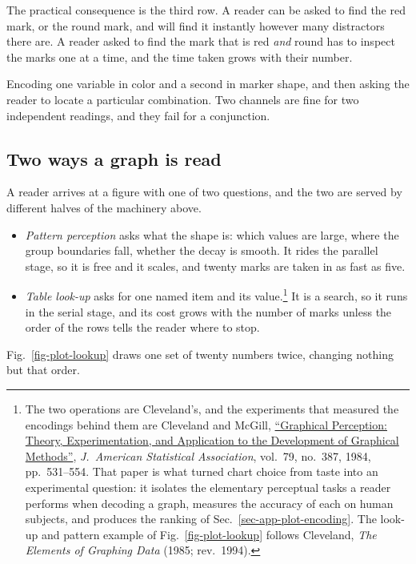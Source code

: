 The practical consequence is the third row. A reader can be asked to find the red mark, or the round mark, and will find it instantly however many distractors there are. A reader asked to find the mark that is red \textit{and} round has to inspect the marks one at a time, and the time taken grows with their number. \begin{box_blue}
Encoding one variable in color and a second in marker shape, and then asking the reader to locate a particular combination. Two channels are fine for two independent readings, and they fail for a conjunction.
\end{box_blue}

\FloatBarrier
\subsection{Two ways a graph is read}\label{sec-app-plot-lookup}

A reader arrives at a figure with one of two questions, and the two are served by different halves of the machinery above. 
\begin{itemize}
	\item \emph{Pattern perception} asks what the shape is: which values are large, where the group boundaries fall, whether the decay is smooth. It rides the parallel stage, so it is free and it scales, and twenty marks are taken in as fast as five.
	\item  \emph{Table look-up} asks for one named item and its value.\footnote{The two operations are Cleveland's, and the experiments that measured the encodings behind them are Cleveland and McGill, \href{https://doi.org/10.1080/01621459.1984.10478080}{``Graphical Perception: Theory, Experimentation, and Application to the Development of Graphical Methods''}, \emph{J.\ American Statistical Association}, vol.~79, no.~387, 1984, pp.~531--554. That paper is what turned chart choice from taste into an experimental question: it isolates the elementary perceptual tasks a reader performs when decoding a graph, measures the accuracy of each on human subjects, and produces the ranking of Sec.~\ref{sec-app-plot-encoding}. The look-up and pattern example of Fig.~\ref{fig-plot-lookup} follows Cleveland, \emph{The Elements of Graphing Data} (1985; rev.\ 1994).} It is a search, so it runs in the serial stage, and its cost grows with the number of marks unless the order of the rows tells the reader where to stop.
\end{itemize}
Fig.~\ref{fig-plot-lookup} draws one set of twenty numbers twice, changing nothing but that order.

